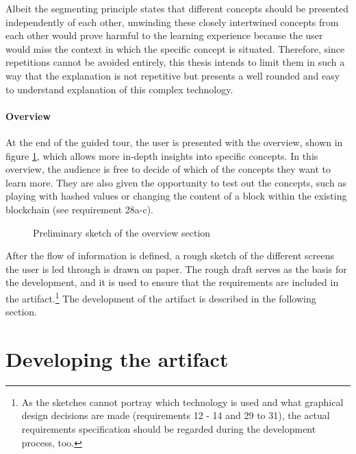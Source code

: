 Albeit the segmenting principle states that different concepts should be presented independently of each other, unwinding these closely intertwined concepts from each other would prove harmful to the learning experience because the user would miss the context in which the specific concept is situated. Therefore, since repetitions cannot be avoided entirely, this thesis intends to limit them in such a way that the explanation is not repetitive but presents a well rounded and easy to understand explanation of this complex technology.

\paragraph{Overview} At the end of the guided tour, the user is presented with the overview, shown in figure \ref{fig:OverviewPic}, which allows more in-depth insights into specific concepts.
In this overview, the audience is free to decide of which of the concepts they want to learn more. They are also given the opportunity to test out the concepts, such as playing with hashed values or changing the content of a block within the existing blockchain (see requirement 28a-c).

\begin{figure}
    \centering
    
    \caption{Preliminary sketch of the overview section}
    \label{fig:OverviewPic}
\end{figure}

After the flow of information is defined, a rough sketch of the different screens the user is led through is drawn on paper. The rough draft serves as the basis for the development, and it is used to ensure that the requirements are included in the artifact.\footnote{As the sketches cannot portray which technology is used and what graphical design decisions are made (requirements 12 - 14 and 29 to 31), the actual requirements specification should be regarded during the development process, too.} The development of the artifact is described in the following section.

\section{Developing the artifact}

